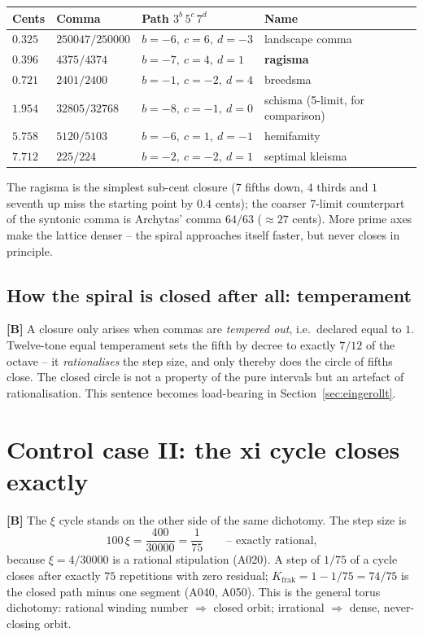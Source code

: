 \begin{center}
\begin{tabular}{llll}
\toprule
Cents & Comma & Path $3^{b}\,5^{c}\,7^{d}$ & Name \\
\midrule
$0.325$ & $250047/250000$ & $b=-6,\ c=6,\ d=-3$ & landscape comma \\
$0.396$ & $4375/4374$ & $b=-7,\ c=4,\ d=1$ & \textbf{ragisma} \\
$0.721$ & $2401/2400$ & $b=-1,\ c=-2,\ d=4$ & breedsma \\
$1.954$ & $32805/32768$ & $b=-8,\ c=-1,\ d=0$ & schisma (5-limit, for comparison) \\
$5.758$ & $5120/5103$ & $b=-6,\ c=1,\ d=-1$ & hemifamity \\
$7.712$ & $225/224$ & $b=-2,\ c=-2,\ d=1$ & septimal kleisma \\
\bottomrule
\end{tabular}
\end{center}

The ragisma is the simplest sub-cent closure ($7$ fifths down, $4$
thirds and $1$ seventh up miss the starting point by $0.4$ cents); the
coarser 7-limit counterpart of the syntonic comma is Archytas' comma
$64/63$ ($\approx 27$ cents). More prime axes make the lattice denser
-- the spiral approaches itself faster, but never closes in principle.

\subsection{How the spiral is closed after all: temperament}

\textbf{[B]} A closure only arises when commas are \emph{tempered out},
i.e.\ declared equal to $1$. Twelve-tone equal temperament sets the
fifth by decree to exactly $7/12$ of the octave -- it
\emph{rationalises} the step size, and only thereby does the circle of
fifths close. The closed circle is not a property of the pure
intervals but an artefact of rationalisation. This sentence becomes
load-bearing in Section~\ref{sec:eingerollt}.

\section{Control case II: the xi cycle closes exactly}

\textbf{[B]} The $\xi$ cycle stands on the other side of the same
dichotomy. The step size is
\[
  100\,\xi = \frac{400}{30000} = \frac{1}{75}
  \qquad\text{-- exactly rational,}
\]
because $\xi = 4/30000$ is a rational stipulation (A020). A step of
$1/75$ of a cycle closes after exactly $75$ repetitions with zero
residual; $K_\text{frak} = 1 - 1/75 = 74/75$ is the closed path minus
one segment (A040, A050). This is the general torus dichotomy:
rational winding number $\Rightarrow$ closed orbit; irrational
$\Rightarrow$ dense, never-closing orbit.

